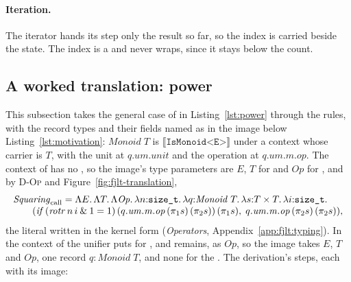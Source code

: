 \paragraph{Iteration.}
The iterator hands its step only the result so far, so the index is carried beside the state.
The index is a  and never wraps, since it stays below the count.


\subsection{A worked translation: power}
\label{app:fjlt:power}

This subsection takes the general case of  in Listing~\ref{lst:power} through the rules, with the record types and their fields named as in the image below Listing~\ref{lst:motivation}: $\mathit{Monoid}\;T$ is $\llbracket \texttt{IsMonoid<E>} \rrbracket$ under a context whose carrier is $T$, with the unit at $q.\mathit{um}.\mathit{unit}$ and the operation at $q.\mathit{um}.\mathit{m}.\mathit{op}$.
The context of  has no , so the image's type parameters are $E$, $T$ for  and $\mathit{Op}$ for , and by \textsc{D-Op} and Figure~\ref{fig:fjlt-translation},
\[
\begin{array}{@{}l@{}}
\mathit{Squaring}_{\mathrm{call}} = \Lambda E.\,\Lambda T.\,\Lambda \mathit{Op}.\,\lambda n{:}\texttt{size\_t}.\,\lambda q{:}\mathit{Monoid}\;T.\,\lambda s{:}T \times T.\,\lambda i{:}\texttt{size\_t}. \\
\qquad (\mathit{if}\,(\mathit{rotr}\,n\,i \mathbin{\&} 1 = 1)\,(q.\mathit{um}.\mathit{m}.\mathit{op}\,(\pi_1 s)\,(\pi_2 s))\,(\pi_1 s),\; q.\mathit{um}.\mathit{m}.\mathit{op}\,(\pi_2 s)\,(\pi_2 s)),
\end{array}
\]
the literal  written  in the kernel form (\emph{Operators}, Appendix~\ref{app:fjlt:typing}).
In the context of  the unifier puts  for , and  remains, as $\mathit{Op}$, so the image takes $E$, $T$ and $\mathit{Op}$, one record $q : \mathit{Monoid}\;T$, and none for the .
The derivation's steps, each with its image:
